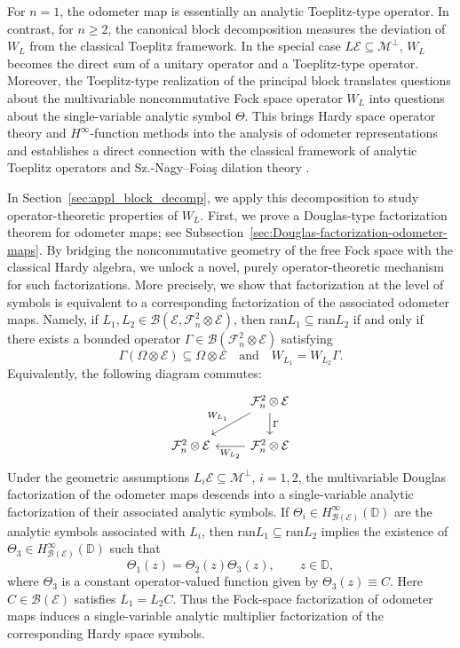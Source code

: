 \documentclass[12pt]{amsart}
\theoremstyle{definition}
\theoremstyle{remark}
\def \D{\mathbb{D}}
\newcommand{\clb}{\mathcal{B}}
\newcommand{\cle}{\mathcal{E}}
\newcommand{\clm}{\mathcal{M}}
\newcommand{\clf}{\mathcal{F}}
\newcommand{\ran}{\mathrm{ran}}
\numberwithin{equation}{section}
\begin{document}
For \(n=1\), the odometer map is essentially an analytic Toeplitz-type
operator. In contrast, for \(n\geq 2\), the canonical block decomposition   
measures the deviation of \(W_L\) from the classical Toeplitz framework. In the special  case \(L\cle\subseteq \clm^\perp\), 
\(W_L\) becomes the direct sum of a unitary operator and a Toeplitz-type
operator. Moreover, the Toeplitz-type realization of the principal block translates
questions about the multivariable noncommutative Fock space operator \(W_L\)
into questions about the single-variable analytic symbol \(\Theta\). This brings
Hardy space operator theory and \(H^\infty\)-function methods into the analysis
of odometer representations and establishes a direct connection with the
classical framework of analytic Toeplitz operators and Sz.-Nagy--Foiaş dilation
theory \cite{SzNagyFoias,Paulsen2002,Pisier2001}.

In Section~\ref{sec:appl_block_decomp}, we apply this decomposition to study
operator-theoretic properties of \(W_L\). First, we prove a
Douglas-type factorization theorem for odometer maps; see
Subsection~\ref{sec:Douglas-factorization-odometer-maps}. By bridging the noncommutative geometry of the free Fock space with the classical Hardy algebra, we unlock a novel, purely operator-theoretic mechanism for such factorizations. More precisely, we
show that factorization at the level of symbols is equivalent to a
corresponding factorization of the associated odometer maps. Namely, if \(L_1,L_2\in\clb(\cle,\clf_n^2\otimes\cle)\), then
\(\ran L_1\subseteq \ran L_2\) if and only if there exists a bounded operator \(\Gamma\in\clb(\clf_n^2\otimes\cle)\) satisfying
\[
\Gamma(\Omega\otimes\cle)\subseteq \Omega\otimes\cle
\quad\text{and}\quad W_{L_1}=W_{L_2}\Gamma.
\]
Equivalently, the following diagram commutes:
\[
\begin{tikzcd}
& \clf_n^2\otimes \cle
\arrow[d, "\Gamma"]
\arrow[dl, swap, "W_{L_1}"]
\\
\clf_n^2\otimes \cle
&
\clf_n^2\otimes \cle
\arrow[l, "W_{L_2}"]
\end{tikzcd}
\]
Under the geometric assumptions $L_i\cle \subseteq \clm^{\perp},\, i=1,2$, the multivariable Douglas factorization of the odometer maps descends into a single-variable analytic factorization of their associated analytic symbols. If
\(\Theta_i\in H^\infty_{\clb(\cle)}(\D)\) are the analytic symbols associated with \(L_i\), then \(\ran L_1\subseteq \ran L_2\) implies the existence of $\Theta_3 \in H^\infty_{\clb(\cle)}(\D)$ such that
\[
\Theta_1(z) = \Theta_2(z) \Theta_3 (z), \qquad z \in \D, 
\]
where $\Theta_3$ is a constant operator-valued function given by $\Theta_3(z) \equiv C$. Here $C \in \clb(\cle)$ satisfies $L_1 =L_2C.$ Thus the Fock-space factorization of odometer maps induces a single-variable analytic multiplier factorization of the corresponding Hardy space symbols.
\end{document}
